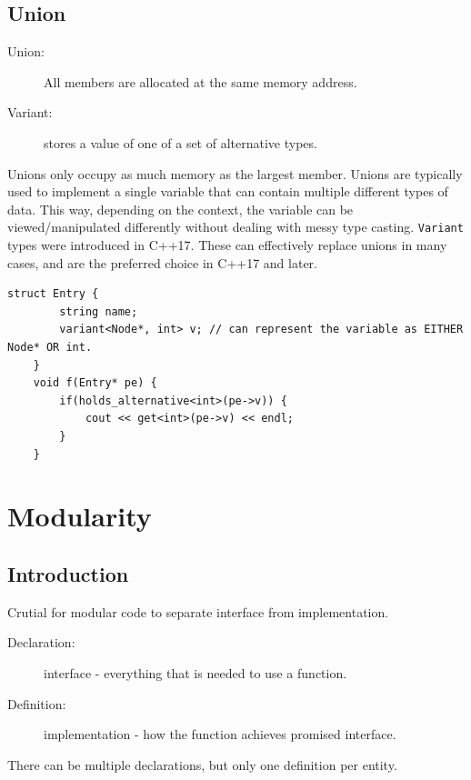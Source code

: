\documentclass[a4paper, 10pt]{article}
\begin{document}
\subsection{Union}
\begin{description}
	\item[Union:]
	      All members are allocated at the same memory address.
\end{description}
\begin{description}
	\item[Variant:]
	      stores a value of one of a set of alternative types.
\end{description}
Unions only occupy as much memory as the largest member. Unions are typically used to implement a single variable that can contain multiple different types of data. This way, depending on the context, the variable can be viewed/manipulated differently without dealing with messy type casting.
\verb!Variant! types were introduced in C++17. These can effectively replace unions in many cases, and are the preferred choice in C++17 and later.
\begin{lstlisting}[style=cpp]
    struct Entry {
        string name;
        variant<Node*, int> v; // can represent the variable as EITHER Node* OR int.
    }
    void f(Entry* pe) {
        if(holds_alternative<int>(pe->v)) {
            cout << get<int>(pe->v) << endl;
        }
    }
\end{lstlisting}



\section{Modularity}
\subsection{Introduction}
Crutial for modular code to separate interface from implementation.
\begin{description}
	\item[Declaration:]
	      interface - everything that is needed to use a function.
\end{description}
\begin{description}
	\item[Definition:]
	      implementation - how the function achieves promised interface.
\end{description}
There can be multiple declarations, but only one definition per entity.
\end{document}
